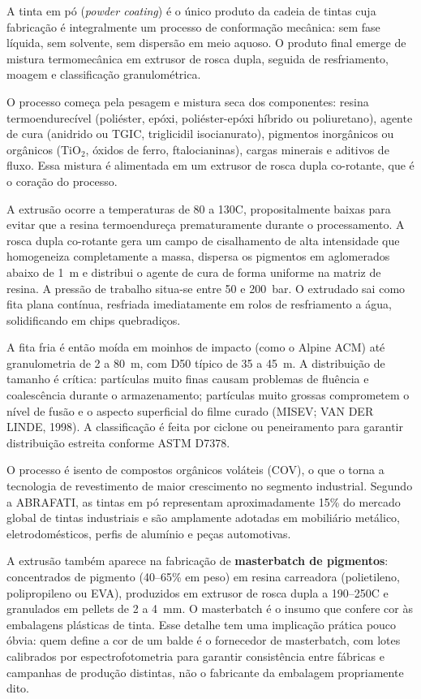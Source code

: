 \documentclass[
  12pt,
  a4paper,
  oneside,
  brazil,
  chapter=TITLE
]{article}
\begin{document}
A tinta em pó (\textit{powder coating}) é o único produto da cadeia de tintas
cuja fabricação é integralmente um processo de conformação mecânica: sem fase
líquida, sem solvente, sem dispersão em meio aquoso. O produto final emerge de
mistura termomecânica em extrusor de rosca dupla, seguida de resfriamento,
moagem e classificação granulométrica.

O processo começa pela pesagem e mistura seca dos componentes: resina
termoendurecível (poliéster, epóxi, poliéster-epóxi híbrido ou poliuretano),
agente de cura (anidrido ou TGIC, triglicidil isocianurato), pigmentos
inorgânicos ou orgânicos (TiO$_2$, óxidos de ferro, ftalocianinas), cargas
minerais e aditivos de fluxo. Essa mistura é alimentada em um extrusor de rosca
dupla co-rotante, que é o coração do processo.

A extrusão ocorre a temperaturas de 80 a 130\textdegree{}C, propositalmente baixas para
evitar que a resina termoendureça prematuramente durante o processamento. A rosca
dupla co-rotante gera um campo de cisalhamento de alta intensidade que
homogeneiza completamente a massa, dispersa os pigmentos em aglomerados abaixo
de 1~\textmu m e distribui o agente de cura de forma uniforme na matriz de resina. A
pressão de trabalho situa-se entre 50 e 200~bar. O extrudado sai como fita plana
contínua, resfriada imediatamente em rolos de resfriamento a água, solidificando
em chips quebradiços.

A fita fria é então moída em moinhos de impacto (como o Alpine ACM) até
granulometria de 2 a 80~\textmu m, com D50 típico de 35 a 45~\textmu m. A distribuição de
tamanho é crítica: partículas muito finas causam problemas de fluência e
coalescência durante o armazenamento; partículas muito grossas comprometem o
nível de fusão e o aspecto superficial do filme curado (MISEV; VAN DER LINDE,
1998). A classificação é feita por ciclone ou peneiramento para garantir
distribuição estreita conforme ASTM D7378.

O processo é isento de compostos orgânicos voláteis (COV), o que o torna a
tecnologia de revestimento de maior crescimento no segmento industrial. Segundo a
ABRAFATI, as tintas em pó representam aproximadamente 15\% do mercado global de
tintas industriais e são amplamente adotadas em mobiliário metálico,
eletrodomésticos, perfis de alumínio e peças automotivas.

A extrusão também aparece na fabricação de \textbf{masterbatch de pigmentos}:
concentrados de pigmento (40--65\% em peso) em resina carreadora (polietileno,
polipropileno ou EVA), produzidos em extrusor de rosca dupla a 190--250\textdegree{}C e
granulados em pellets de 2 a 4~mm. O masterbatch é o insumo que confere cor às
embalagens plásticas de tinta. Esse detalhe tem uma implicação prática pouco
óbvia: quem define a cor de um balde é o fornecedor de masterbatch, com lotes
calibrados por espectrofotometria para garantir consistência entre fábricas e
campanhas de produção distintas, não o fabricante da embalagem propriamente dito.
\end{document}
